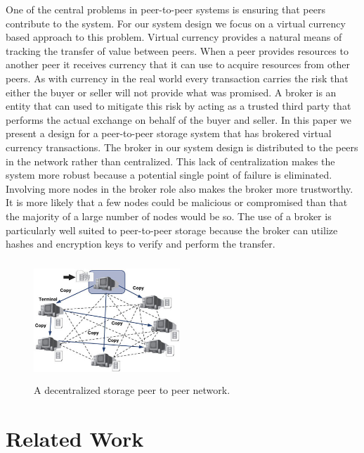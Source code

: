 \documentclass[%
				10pt,
        final,
        notitlepage,
        narroweqnarray,
        inline,
        twoside,
        ]{ieee}
\begin{document}
One of the central problems in peer-to-peer systems is ensuring that peers contribute to the system.  For our system design we focus on a virtual currency based approach to this problem.  Virtual currency provides a natural means of tracking the transfer of value between peers.  When a peer provides resources to another peer it receives currency that it can use to acquire resources from other peers.  As with currency in the real world every transaction carries the risk that either the buyer or seller will not provide what was promised.  A broker is an entity that can used to mitigate this risk by acting as a trusted third party that performs the actual exchange on behalf of the buyer and seller.  In this paper we present a design for a peer-to-peer storage system that has brokered virtual currency transactions.  The broker in our system design is distributed to the peers in the network rather than centralized.  This lack of centralization makes the system more robust because a potential single point of failure is eliminated.  Involving more nodes in the broker role also makes the broker more trustworthy.  It is more likely that a few nodes could be malicious or compromised than that the majority of a large number of nodes would be so.  The use of a broker is particularly well suited to peer-to-peer storage because the broker can utilize hashes and encryption keys to verify and perform the transfer.

\begin{figure}
  \begin{center}
    \includegraphics[height=45mm,width=55mm]{graphics/P2PNetwork.jpg}
  \caption{A decentralized storage peer to peer network.}
  \end{center}
\end{figure}

\section{Related Work}
\end{document}
